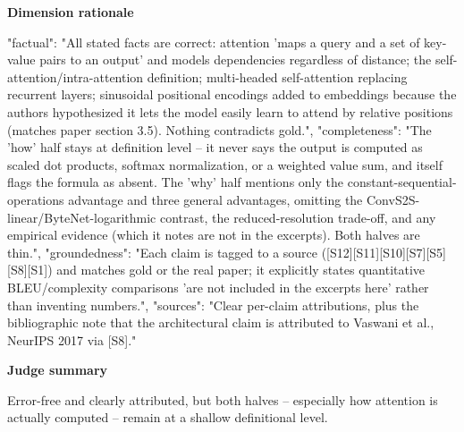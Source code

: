 \documentclass[10pt]{article}
\begin{document}
\textbf{Dimension rationale}
\begin{EvidenceText}
{
  "factual": "All stated facts are correct: attention 'maps a query and a set of key-value pairs to an output' and models dependencies regardless of distance; the self-attention/intra-attention definition; multi-headed self-attention replacing recurrent layers; sinusoidal positional encodings added to embeddings because the authors hypothesized it lets the model easily learn to attend by relative positions (matches paper section 3.5). Nothing contradicts gold.",
  "completeness": "The 'how' half stays at definition level -- it never says the output is computed as scaled dot products, softmax normalization, or a weighted value sum, and itself flags the formula as absent. The 'why' half mentions only the constant-sequential-operations advantage and three general advantages, omitting the ConvS2S-linear/ByteNet-logarithmic contrast, the reduced-resolution trade-off, and any empirical evidence (which it notes are not in the excerpts). Both halves are thin.",
  "groundedness": "Each claim is tagged to a source ([S12][S11][S10][S7][S5][S8][S1]) and matches gold or the real paper; it explicitly states quantitative BLEU/complexity comparisons 'are not included in the excerpts here' rather than inventing numbers.",
  "sources": "Clear per-claim attributions, plus the bibliographic note that the architectural claim is attributed to Vaswani et al., NeurIPS 2017 via [S8]."
}
\end{EvidenceText}

\textbf{Judge summary}
\begin{EvidenceText}
Error-free and clearly attributed, but both halves -- especially how attention is actually computed -- remain at a shallow definitional level.
\end{EvidenceText}
\end{document}
